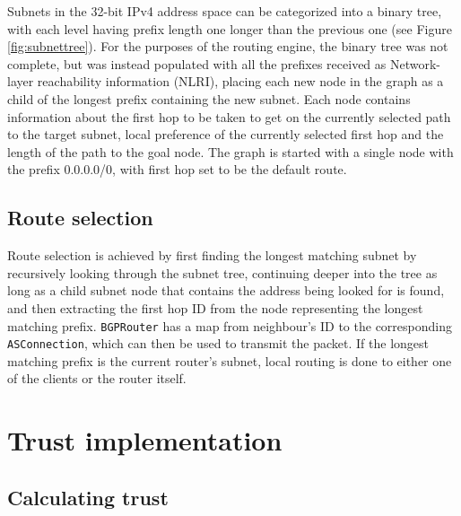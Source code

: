 \documentclass[11pt,a4paper,titlepage]{report}
\begin{document}
Subnets in the 32-bit IPv4 address space can be categorized into a binary tree, with each level having prefix length one longer than the previous one (see Figure \ref{fig:subnettree}). For the purposes of the routing engine, the binary tree was not complete, but was instead populated with all the prefixes received as Network-layer reachability information (NLRI), placing each new node in the graph as a child of the longest prefix containing the new subnet. Each node contains information about the first hop to be taken to get on the currently selected path to the target subnet, local preference of the currently selected first hop and the length of the path to the goal node. The graph is started with a single node with the prefix 0.0.0.0/0, with first hop set to be the default route.

\subsection{Route selection}
Route selection is achieved by first finding the longest matching subnet by recursively looking through the subnet tree, continuing deeper into the tree as long as a child subnet node that contains the address being looked for is found, and then extracting the first hop ID from the node representing the longest matching prefix. \texttt{BGPRouter} has a map from neighbour's ID to the corresponding \texttt{ASConnection}, which can then be used to transmit the packet. If the longest matching prefix is the current router's subnet, local routing is done to either one of the clients or the router itself.

\section{Trust implementation}\label{sec:trust}

\subsection{Calculating trust}\label{ssec:trustcalc}
\end{document}
